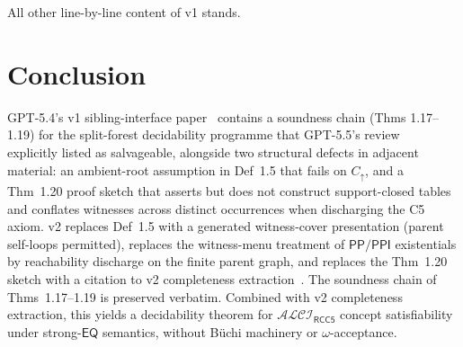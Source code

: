 \documentclass[11pt]{article}
\theoremstyle{definition}
\theoremstyle{remark}
\newcommand{\PP}{\mathsf{PP}}
\newcommand{\PPI}{\mathsf{PPI}}
\newcommand{\EQ}{\mathsf{EQ}}
\newcommand{\ALCIRCC}[1]{\mathcal{ALCI}_{\mathsf{RCC#1}}}
\begin{document}
All other line-by-line content of v1 stands.

\section{Conclusion}

GPT-5.4's v1 sibling-interface paper~\cite{SiblingV1} contains
a soundness chain (Thms 1.17--1.19) for the split-forest
decidability programme that GPT-5.5's review~\cite{GPT55Review}
explicitly listed as salvageable, alongside two structural
defects in adjacent material: an ambient-root assumption in
Def~1.5 that fails on $C_\uparrow$, and a Thm~1.20 proof sketch
that asserts but does not construct support-closed tables and
conflates witnesses across distinct occurrences when discharging
the C5 axiom. v2 replaces Def~1.5 with a generated witness-cover
presentation (parent self-loops permitted), replaces the
witness-menu treatment of $\PP/\PPI$ existentials by
reachability discharge on the finite parent graph, and replaces
the Thm~1.20 sketch with a citation to v2 completeness
extraction~\cite{CompletenessV2}. The soundness chain of
Thms~1.17--1.19 is preserved verbatim. Combined with v2
completeness extraction, this yields a decidability theorem for
$\ALCIRCC{5}$ concept satisfiability under strong-$\EQ$
semantics, without B\"uchi machinery or
$\omega$-acceptance.
\end{document}
